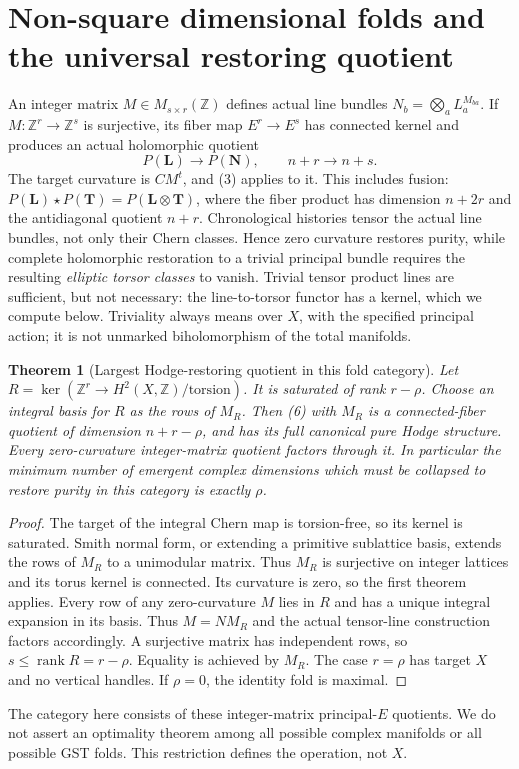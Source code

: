 \documentclass[11pt]{article}
\newtheorem{theorem}{Theorem}
\newcommand{\rk}{\operatorname{rank}}
\begin{document}
\section{Non-square dimensional folds and the universal restoring quotient}
An integer matrix $M\in M_{s\times r}(\mathbb Z)$ defines actual line bundles
$N_b=\bigotimes_a L_a^{M_{ba}}$. If $M:\mathbb Z^r\to\mathbb Z^s$ is
surjective, its fiber map $E^r\to E^s$ has connected kernel and produces an
actual holomorphic quotient
\[
 P(\mathbf L)\longrightarrow P(\mathbf N),\qquad n+r\longrightarrow n+s.
                                                                         \tag{6}
\]
The target curvature is $CM^t$, and (3) applies to it. This includes fusion:
$P(\mathbf L)\star P(\mathbf T)=P(\mathbf L\otimes\mathbf T)$, where the
fiber product has dimension $n+2r$ and the antidiagonal quotient $n+r$.
Chronological histories tensor the actual line bundles, not only their
Chern classes. Hence zero curvature restores purity, while complete
holomorphic restoration to a trivial principal bundle requires the resulting
\emph{elliptic torsor classes} to vanish. Trivial tensor product lines are
sufficient, but not necessary: the line-to-torsor functor has a kernel,
which we compute below. Triviality always means over $X$, with the specified
principal action; it is not unmarked biholomorphism of the total manifolds.

\begin{theorem}[Largest Hodge-restoring quotient in this fold category]
Let
$R=\ker(\mathbb Z^r\to H^2(X,\mathbb Z)/\mathrm{torsion})$.
It is saturated of rank $r-\rho$. Choose an integral basis for $R$ as the
rows of $M_R$. Then (6) with $M_R$ is a connected-fiber quotient of dimension
$n+r-\rho$, and has its full canonical pure Hodge structure. Every
zero-curvature integer-matrix quotient factors through it. In particular
the minimum number of emergent complex dimensions which must be collapsed
to restore purity in this category is exactly $\rho$.
\end{theorem}
\begin{proof}
The target of the integral Chern map is torsion-free, so its kernel is
saturated. Smith normal form, or extending a primitive sublattice basis,
extends the rows of $M_R$ to a unimodular matrix. Thus $M_R$ is surjective
on integer lattices and its torus kernel is connected. Its curvature is
zero, so the first theorem applies. Every row of any zero-curvature $M$
lies in $R$ and has a unique integral expansion in its basis. Thus
$M=NM_R$ and the actual tensor-line construction factors accordingly.
A surjective matrix has independent rows, so $s\leq\rk R=r-\rho$.
Equality is achieved by $M_R$. The case $r=\rho$ has target $X$ and no
vertical handles. If $\rho=0$, the identity fold is maximal.
\end{proof}
The category here consists of these integer-matrix principal-$E$ quotients.
We do not assert an optimality theorem among all possible complex manifolds
or all possible GST folds. This restriction defines the operation, not $X$.
\end{document}
